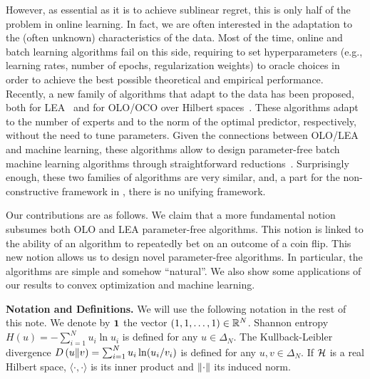 However, as essential as it is to achieve sublinear regret, this is only half
of the problem in online learning. In fact, we are often interested in the
adaptation to the (often unknown) characteristics of the data. Most of the
time, online and batch learning algorithms fail on this side, requiring to set
hyperparameters (e.g., learning rates, number of epochs, regularization weights)
to oracle choices in order to achieve the best possible theoretical and
empirical performance. Recently, a new family of algorithms that adapt to the
data has been proposed, both for \ac{LEA}~\citep{Chaudhuri-Freund-Hsu-2009,
Chernov-Vovk-2010, Luo-Schapire-2014, Luo-Schapire-2015, Koolen-van-Erven-2015}
and for \ac{OLO}/\ac{OCO} over Hilbert spaces~\citep{Streeter-McMahan-2012,
Orabona-2013, McMahan-Abernethy-2013, McMahan-Orabona-2014, Orabona-2014}.
These algorithms adapt to the number of experts and to the norm of the optimal
predictor, respectively, without the need to tune parameters. Given the
connections between \ac{OLO}/\ac{LEA} and machine learning, these algorithms
allow to design parameter-free batch machine learning algorithms through
straightforward reductions~\citep{Orabona-2014,Luo-Schapire-2015}.
Surprisingly enough, these two families of algorithms are very similar, and, a part for the non-constructive framework in \cite{Foster-Rakhlin-Sridharan-2015}, there is no unifying framework.

Our contributions are as follows. We claim that a more fundamental notion
subsumes both \ac{OLO} and \ac{LEA} parameter-free algorithms. This notion is
linked to the ability of an algorithm to repeatedly bet on an outcome of a coin
flip. This new notion allows us to design novel parameter-free algorithms. In particular, the algorithms are simple and somehow ``natural''. We also show some applications of our results to convex optimization and machine learning.

\noindent\textbf{Notation and Definitions.} We will use the following notation
in the rest of this note. We denote by $\mathbf{1}$ the vector $(1,1,\dots,1)
\in \mathbb{R}^N$. Shannon entropy $H(u) = -\sum_{i=1}^N u_i \ln u_i$ is defined for
any $u \in \Delta_N$.  The Kullback-Leibler divergence $D\left({u}\middle\|{v}\right) =
\sum_{i=1}^N u_i \ln(u_i/v_i)$ is defined for any $u,v \in \Delta_N$. If $\mathcal{H}$
is a real Hilbert space, $\langle \cdot, \cdot \rangle$ is its inner
product and $\left\|{\cdot}\right\|$ its induced norm.
